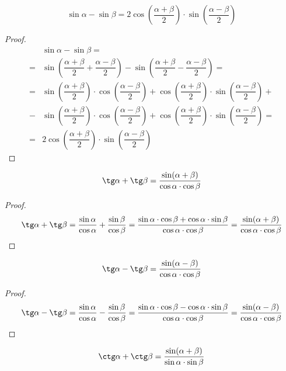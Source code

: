 \documentclass[12pt]{article}
\begin{document}
    \begin{statement}
        $$\sin\alpha-\sin\beta=2\cos\left(\dfrac{\alpha+\beta}{2}\right)\cdot\sin\left(\dfrac{\alpha-\beta}{2}\right)$$
    \end{statement}
    \begin{proof}
        \begin{align*}
            &\sin\alpha-\sin\beta=\\
            =&\sin\left(\dfrac{\alpha+\beta}{2}+\dfrac{\alpha-\beta}{2}\right)-\sin\left(\dfrac{\alpha+\beta}{2}-\dfrac{\alpha-\beta}{2}\right)=\\
            =&\sin\left(\dfrac{\alpha+\beta}{2}\right)\cdot\cos\left(\dfrac{\alpha-\beta}{2}\right)+\cos\left(\dfrac{\alpha+\beta}{2}\right)\cdot\sin\left(\dfrac{\alpha-\beta}{2}\right)+\\
            -&\sin\left(\dfrac{\alpha+\beta}{2}\right)\cdot\cos\left(\dfrac{\alpha-\beta}{2}\right)+\cos\left(\dfrac{\alpha+\beta}{2}\right)\cdot\sin\left(\dfrac{\alpha-\beta}{2}\right)=\\
            =&2\cos\left(\dfrac{\alpha+\beta}{2}\right)\cdot\sin\left(\dfrac{\alpha-\beta}{2}\right)
        \end{align*}
    \end{proof}
    \begin{statement}
        $$\tg\alpha+\tg\beta=\dfrac{\sin(\alpha+\beta)}{\cos\alpha\cdot\cos\beta}$$
    \end{statement}
    \begin{proof}
        $$\tg\alpha+\tg\beta=\dfrac{\sin\alpha}{\cos\alpha}+\dfrac{\sin\beta}{\cos\beta}=\dfrac{\sin\alpha\cdot\cos\beta+\cos\alpha\cdot\sin\beta}{\cos\alpha\cdot\cos\beta}=\dfrac{\sin(\alpha+\beta)}{\cos\alpha\cdot\cos\beta}$$
    \end{proof}
    \begin{statement}
        $$\tg\alpha-\tg\beta=\dfrac{\sin(\alpha-\beta)}{\cos\alpha\cdot\cos\beta}$$
    \end{statement}
    \begin{proof}
        $$\tg\alpha-\tg\beta=\dfrac{\sin\alpha}{\cos\alpha}-\dfrac{\sin\beta}{\cos\beta}=\dfrac{\sin\alpha\cdot\cos\beta-\cos\alpha\cdot\sin\beta}{\cos\alpha\cdot\cos\beta}=\dfrac{\sin(\alpha-\beta)}{\cos\alpha\cdot\cos\beta}$$
    \end{proof}
    \begin{statement}
        $$\ctg\alpha+\ctg\beta=\dfrac{\sin(\alpha+\beta)}{\sin\alpha\cdot\sin\beta}$$
    \end{statement}
\end{document}
